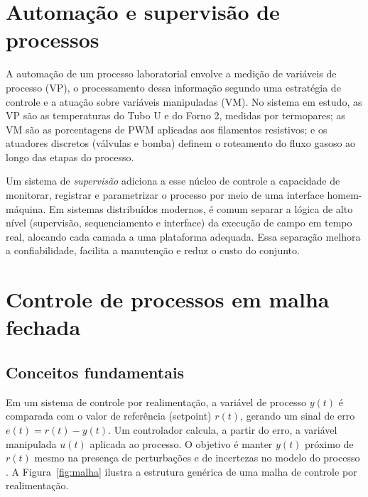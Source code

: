 \section{Automa\c{c}\~ao e supervis\~ao de processos}

A automa\c{c}\~ao de um processo laboratorial envolve a medi\c{c}\~ao de
vari\'aveis de processo (VP), o processamento dessa informa\c{c}\~ao segundo uma
estrat\'egia de controle e a atua\c{c}\~ao sobre vari\'aveis manipuladas (VM).
No sistema em estudo, as VP s\~ao as temperaturas do Tubo U e do Forno 2,
medidas por termopares; as VM s\~ao as porcentagens de PWM aplicadas aos
filamentos resistivos; e os atuadores discretos (v\'alvulas e bomba) definem o
roteamento do fluxo gasoso ao longo das etapas do processo.

Um sistema de \emph{supervis\~ao} adiciona a esse n\'ucleo de controle a
capacidade de monitorar, registrar e parametrizar o processo por meio de uma
interface homem-m\'aquina. Em sistemas distribu\'idos modernos, \'e comum
separar a l\'ogica de alto n\'ivel (supervis\~ao, sequenciamento e interface) da
execu\c{c}\~ao de campo em tempo real, alocando cada camada a uma plataforma
adequada. Essa separa\c{c}\~ao melhora a confiabilidade, facilita a manuten\c{c}\~ao
e reduz o custo do conjunto.

\section{Controle de processos em malha fechada}

\subsection{Conceitos fundamentais}

Em um sistema de controle por realimenta\c{c}\~ao, a vari\'avel de processo
$y(t)$ \'e comparada com o valor de refer\^encia (setpoint) $r(t)$, gerando um
sinal de erro $e(t)=r(t)-y(t)$. Um controlador calcula, a partir do erro, a
vari\'avel manipulada $u(t)$ aplicada ao processo. O objetivo \'e manter $y(t)$
pr\'oximo de $r(t)$ mesmo na presen\c{c}a de perturba\c{c}\~oes e de incertezas
no modelo do processo \cite{ogata2010}. A Figura~\ref{fig:malha} ilustra a
estrutura gen\'erica de uma malha de controle por realimenta\c{c}\~ao.

